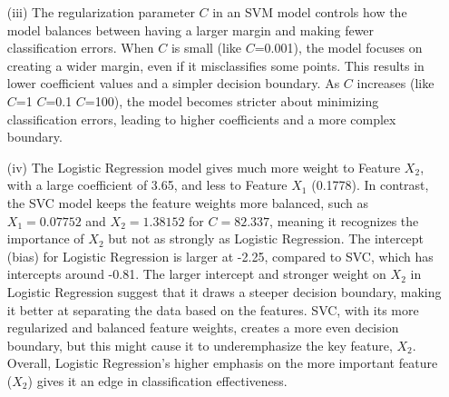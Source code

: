 \documentclass{article}
\begin{document}
\begin{enumerate}
    \item[(iii)] The regularization parameter $C$ in an SVM model controls how the model balances between having a larger margin and making fewer classification errors. When $C$ is small (like $C$=0.001), the model focuses on creating a wider margin, even if it misclassifies some points. This results in lower coefficient values and a simpler decision boundary. As $C$ increases (like $C$=1 $C$=0.1 $C$=100), the model becomes stricter about minimizing classification errors, leading to higher coefficients and a more complex boundary.

    \item[(iv)] The Logistic Regression model gives much more weight to Feature $X_2$, with a large coefficient of 3.65, and less to Feature $X_1$ (0.1778). In contrast, the SVC model keeps the feature weights more balanced, such as \( X_1 = 0.07752 \) and \( X_2 = 1.38152 \) for \( C = 82.337 \), meaning it recognizes the importance of $X_2$ but not as strongly as Logistic Regression. The intercept (bias) for Logistic Regression is larger at -2.25, compared to SVC, which has intercepts around -0.81. The larger intercept and stronger weight on $X_2$ in Logistic Regression suggest that it draws a steeper decision boundary, making it better at separating the data based on the features. SVC, with its more regularized and balanced feature weights, creates a more even decision boundary, but this might cause it to underemphasize the key feature, $X_2$. Overall, Logistic Regression's higher emphasis on the more important feature ($X_2$) gives it an edge in classification effectiveness.
\end{enumerate}
\end{document}
